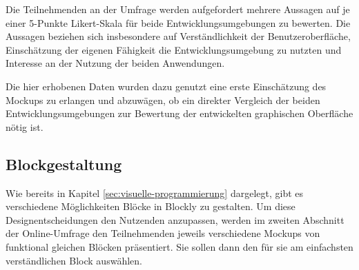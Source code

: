 Die Teilnehmenden an der Umfrage werden aufgefordert mehrere Aussagen auf je einer 5-Punkte Likert-Skala für beide Entwicklungsumgebungen zu bewerten. Die Aussagen beziehen sich insbesondere auf Verständlichkeit der Benutzeroberfläche, Einschätzung der eigenen Fähigkeit die Entwicklungsumgebung zu nutzten und Interesse an der Nutzung der beiden Anwendungen. %

Die hier erhobenen Daten wurden dazu genutzt eine erste Einschätzung des Mockups zu erlangen und abzuwägen, ob ein direkter Vergleich der beiden Entwicklungsumgebungen zur Bewertung der entwickelten graphischen Oberfläche nötig ist.

%
%
%

\subsection{Blockgestaltung}
Wie bereits in Kapitel \ref{sec:visuelle-programmierung} dargelegt, gibt es verschiedene Möglichkeiten Blöcke in Blockly zu gestalten. Um diese Designentscheidungen den Nutzenden anzupassen, werden im zweiten Abschnitt der Online-Umfrage den Teilnehmenden jeweils verschiedene Mockups von funktional gleichen Blöcken präsentiert. Sie sollen dann den für sie am einfachsten verständlichen Block auswählen.

